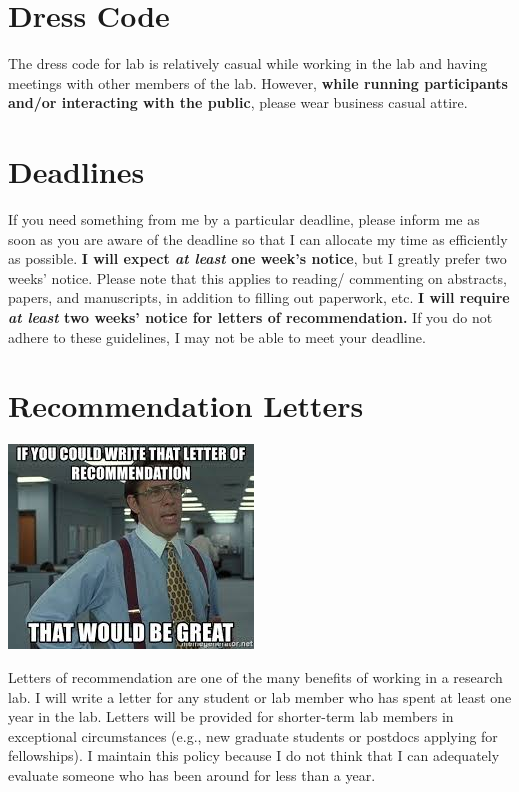\documentclass[]{book}
\begin{document}
\hypertarget{dress-code}{%
\section{Dress Code}\label{dress-code}}

The dress code for lab is relatively casual while working in the lab and having meetings with other members of the lab. However,
\textbf{while running participants and/or interacting with the public}, please wear business casual attire.

\hypertarget{deadlines}{%
\section{Deadlines}\label{deadlines}}

If you need something from me by a particular deadline, please inform me as soon as you are aware of the deadline so that I can allocate my time as efficiently as possible. \textbf{I will expect \emph{at least} one week's notice}, but I greatly prefer two weeks' notice. Please note that this applies to reading/ commenting on abstracts, papers, and manuscripts, in addition to filling out paperwork, etc. \textbf{I will require \emph{at least} two weeks' notice for letters of recommendation.} If you do not adhere to these guidelines, I may not be able to meet your deadline.

\hypertarget{recommendation-letters}{%
\section{Recommendation Letters}\label{recommendation-letters}}

\includegraphics{images/recletter.jpg}

Letters of recommendation are one of the many benefits of working in a research lab. I will write a letter for any student or lab member who has spent at least one year in the lab. Letters will be provided for shorter-term lab members in exceptional circumstances (e.g., new graduate students or postdocs applying for fellowships). I maintain this policy because I do not think that I can adequately evaluate someone who has been around for less than a year.
\end{document}

